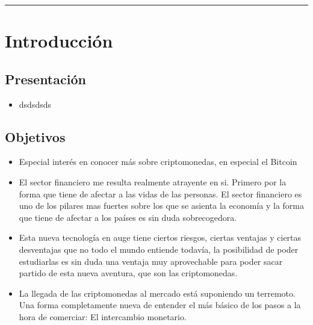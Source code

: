 \documentclass[10pt,twocolumn]{article}
\theoremstyle{definition}
\begin{document}

\tableofcontents

\vspace{20pt}
\hrule
\vspace{10pt}



\section{Introducción}

\subsection{Presentación}
\begin{itemize}
    \item dsdsdsds

   
\end{itemize}

\subsection{Objetivos}

\begin{itemize}
    \item Especial interés en conocer más sobre criptomonedas, en especial el Bitcoin
    \item El sector financiero me resulta realmente atrayente en si. Primero por la forma que tiene de afectar a las vidas de las personas. El sector financiero es uno de los pilares mas fuertes sobre los que se asienta la economía y la forma que tiene de afectar a los países es sin duda sobrecogedora.
    \item Esta nueva tecnología en auge tiene ciertos riesgos, ciertas ventajas y ciertas desventajas que no todo el mundo entiende todavía, la posibilidad de poder estudiarlas es sin duda una ventaja muy aprovechable para poder sacar partido de esta nueva aventura, que son las criptomonedas.
    \item La llegada de las criptomonedas al mercado está suponiendo un terremoto. Una forma completamente nueva de entender el más básico de los pasos a la hora de comerciar: El intercambio monetario.
\end{itemize}
\end{document}
